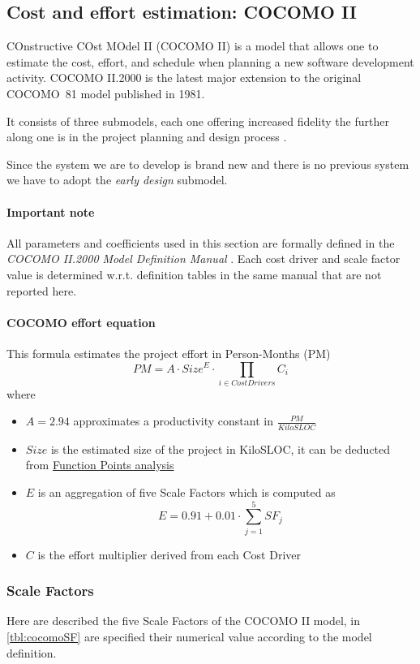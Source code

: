 \subsection{Cost and effort estimation: COCOMO II} 
COnstructive COst MOdel II (COCOMO II) is a model that allows one to estimate the cost, effort, and schedule when planning a new software development activity. COCOMO II.2000 is the latest major extension to the original \mbox{COCOMO 81} model published in 1981.

It consists of three submodels, each one offering increased fidelity the further along one is in the project planning and design process \cite{COCOMO}.

Since the system we are to develop is brand new and there is no previous system we have to adopt the \emph{early design} submodel.

\paragraph{Important note}All parameters and coefficients used in this section are formally defined in the \emph{COCOMO II.2000 Model Definition Manual} \cite{COCOMOManual}. Each cost driver and scale factor value is determined w.r.t. definition tables in the same manual that are not reported here.

\paragraph{COCOMO effort equation}\label{par:cocomoEquation}This formula estimates the project effort in Person-Months (PM)
$$PM = A \cdot Size^{E} \cdot \prod_{i \in CostDrivers}C_{i}$$
where 
\begin{itemize}
	\item $A=2.94$ approximates a productivity constant in $\frac{PM}{KiloSLOC}$
	\item $Size$ is the estimated size of the project in KiloSLOC, it can be deducted from \hyperref[sec:FPResult]{Function Points analysis}
	\item $E$ is an aggregation of five Scale Factors which is computed as $$E = 0.91 + 0.01 \cdot \sum_{j=1}^{5}{SF_j}$$
	\item $C$ is the effort multiplier derived from each Cost Driver
\end{itemize}

\clearpage

\subsubsection{Scale Factors}
Here are described the five Scale Factors of the COCOMO II model, in \autoref{tbl:cocomoSF} are specified their numerical value according to the model definition.
 
